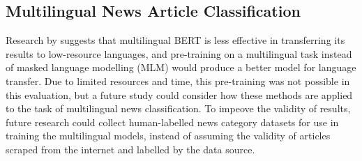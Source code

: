 \documentclass{l4proj}
\begin{document}
\subsection{Multilingual News Article Classification}
Research by \cite{wu2020all} suggests that multilingual BERT is less effective in transferring its results to low-resource languages, and pre-training on a multilingual task instead of masked language modelling (MLM) would produce a better model for language transfer. Due to limited resources and time, this pre-training was not possible in this evaluation, but a future study could consider how these methods are applied to the task of multilingual news classification. To impeove the validity of results, future research could collect human-labelled news category datasets for use in training the multilingual models, instead of assuming the validity of articles scraped from the internet and labelled by the data source.
\end{document}
